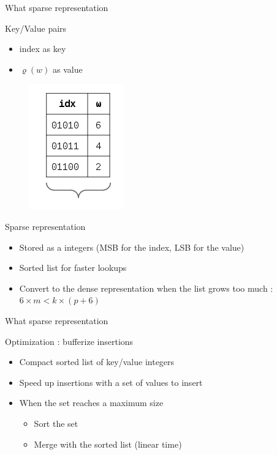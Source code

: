 \documentclass{beamer}
\begin{document}
\begin{frame}{What sparse representation}


\begin{block}{Key/Value pairs}
\begin{itemize}
\item index as key
\item $\varrho(w)$ as value
\end{itemize}
\end{block}

\begin{figure}[c]
\includegraphics [scale=0.5]  {hyperloglog_list.png}
\end{figure}

\begin{block}{Sparse representation}
\begin{itemize}
\item Stored as a integers (MSB for the index, LSB for the value)
\item Sorted list for faster lookups
\item Convert to the dense representation when the list grows too much : $6\times m < k\times (p + 6)$
\end{itemize}
\end{block}

\end{frame}


\begin{frame}{What sparse representation}


\begin{block}{Optimization : bufferize insertions}
\begin{itemize}
\item Compact sorted list of key/value integers
\item Speed up insertions with a set of values to insert
\item When the set reaches a maximum size
\begin{itemize}
\item Sort the set
\item Merge with the sorted list (linear time)
\end{itemize}
\end{itemize}
\end{block}

\end{frame}
\end{document}
